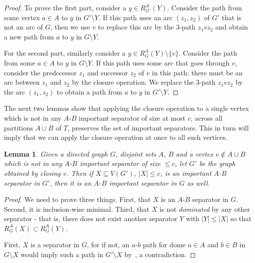 \documentclass[11pt]{article}
\newtheorem{lemma}[theorem]{Lemma}
\begin{document}
{\begin{proof}

To prove the first part, consider a $y \in R^A_{G'}(Y)$. Consider the path from some vertex $a \in A$ to $y$ in $G' \setminus Y$. If this path uses an arc $(z_1,z_2)$ of $G'$ that is not an arc of $G$, then we use $v$ to replace this arc by the $3$-path $z_1vz_2$ and obtain a new path from $a$ to $y$ in $G \setminus Y$.

For the second part, similarly consider a $y \in R^A_{G}(Y) \setminus \{v\}$. Consider the path from some $a \in A$ to $y$ in $G \setminus Y$. If this path uses some arc that goes through $v$, consider the predecessor $z_1$ and successor $z_2$ of $v$ in this path: there must be an arc between $z_1$ and $z_2$ by the closure operation. We replace the 3-path $z_1vz_2$ by the arc $(z_1,z_2)$ to obtain a path from $a$ to $y$ in $G' \setminus Y$. 



 


\end{proof}










The next two lemmas show that applying the closure operation to a single vertex which is not in any $A$-$B$ important separator of size at most $c$, across all partitions $A \cup B$ of $T$, preserves the set of important separators. This in turn will imply that we can apply the closure operation at once to all such vertices.  

\begin{lemma}\label{lemma:mimicking1}
Given a directed graph $G$, disjoint sets $A$, $B$ and a vertex $v \notin A \cup B$ which is not in any $A$-$B$ important separator of size $\leq c$, let $G'$ be the graph obtained by closing $v$. Then if $X \subseteq V(G')$, $|X| \leq c$, is an important $A$-$B$ separator in $G'$, then it is an $A$-$B$ important separator in $G$ as well.
\end{lemma}
\begin{proof}
We need to prove three things. First, that $X$ is an $A$-$B$ separator in $G$. Second, it is inclusion-wise minimal. Third, that $X$ is not \emph{dominated} by any other separator - that is, there does not exist another separator $Y$ with $|Y| \leq |X|$ so that $R_{G}^A(X) \subset R_{G}^A(Y)$.

First, $X$ is a separator in $G$, for if not, an $a$-$b$ path for dome $a \in A$ and $b \in B$ in $G \setminus X$ would imply such a path in $G' \setminus X$ by~, a contradiction.


\end{proof}}
\end{document}
